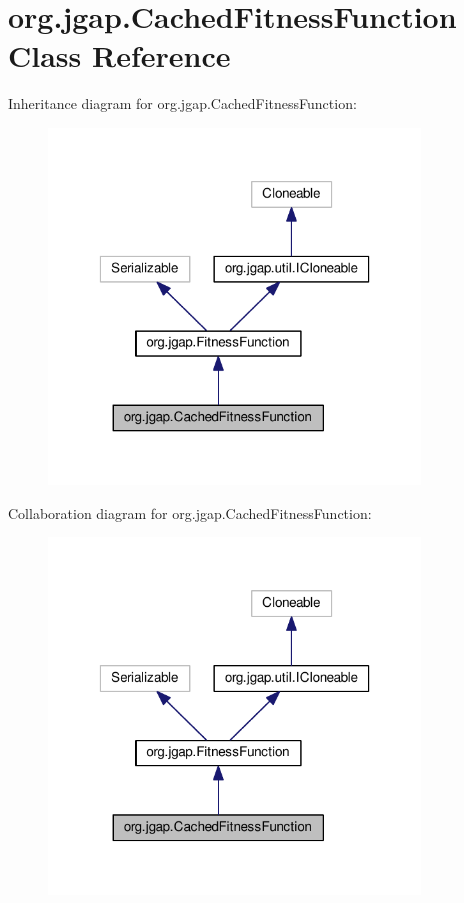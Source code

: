 \hypertarget{classorg_1_1jgap_1_1_cached_fitness_function}{\section{org.\-jgap.\-Cached\-Fitness\-Function Class Reference}
\label{classorg_1_1jgap_1_1_cached_fitness_function}
}


Inheritance diagram for org.\-jgap.\-Cached\-Fitness\-Function\-:
\nopagebreak
\begin{figure}[H]
\begin{center}
\leavevmode
\includegraphics[width=280pt]{classorg_1_1jgap_1_1_cached_fitness_function__inherit__graph}
\end{center}
\end{figure}


Collaboration diagram for org.\-jgap.\-Cached\-Fitness\-Function\-:
\nopagebreak
\begin{figure}[H]
\begin{center}
\leavevmode
\includegraphics[width=280pt]{classorg_1_1jgap_1_1_cached_fitness_function__coll__graph}
\end{center}
\end{figure}
